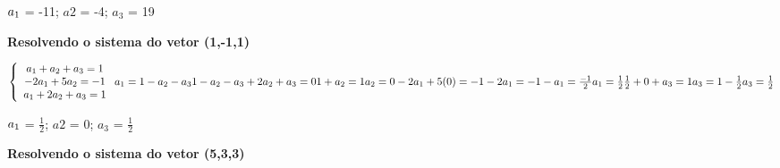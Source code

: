 \documentclass{article}
\begin{document}
$\\
a_{1}$ = -11; $a{2}$ = -4; $a_{3}$ = 19
\newline

\vspace{0,5cm}
\textbf{Resolvendo o sistema do vetor (1,-1,1)}
\vspace{0,5cm}

$
\left\{\begin{array}{ccc}
 a_{1} + a_{2} + a_{3} = 1\\
 -2a_{1} + 5a_{2} = -1\\
 a_{1} + 2a_{2} + a_{3} = 1
\end{array}\right.\\
\newline
a_{1} = 1 - a_{2} - a_{3}\\
\newline
1 - a_{2} - a_{3} + 2a_{2} + a_{3} = 0\\
1 + a_{2} = 1\\
a_{2} = 0\\
\newline
-2a_{1} + 5(0) = -1\\
-2a_{1} = -1\\
-a_{1} = \frac{-1}{2}\\
a_{1} = \frac{1}{2}\\
\newline
\frac{1}{2} + 0 + a_{3} = 1\\
a_{3} =  1 - \frac{1}{2}\\
a_{3} = \frac{1}{2}\\
$

$\\
a_{1}$ = $\frac{1}{2}$; $a{2}$ = 0; $a_{3}$ = $\frac{1}{2}$
\newline

\vspace{0,5cm}
\textbf{Resolvendo o sistema do vetor (5,3,3)}
\vspace{0,5cm}
\end{document}

